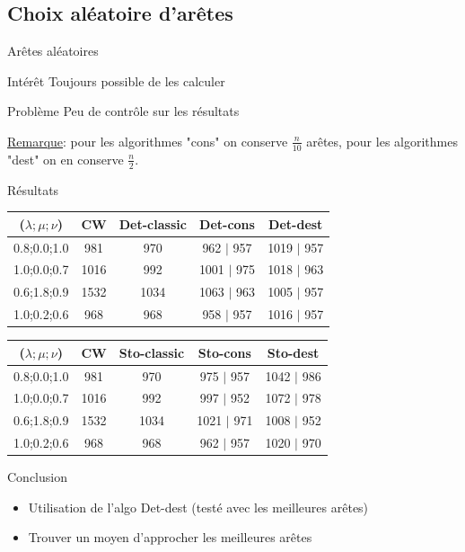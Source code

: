 \documentclass{beamer}
\begin{document}
\subsection{Choix aléatoire d'arêtes}

\begin{frame}{Arêtes aléatoires}

\begin{block}{Intérêt}
Toujours possible de les calculer
\end{block}

\begin{alertblock}{Problème}
Peu de contrôle sur les résultats
\end{alertblock}


\underline{Remarque}: pour les algorithmes "cons" on conserve $\frac{n}{10}$ arêtes, pour les algorithmes "dest" on en conserve $\frac{n}{2}$.

\end{frame}

\begin{frame}{Résultats}

\begin{tabular}{|c|c|c|c|c|}
   \hline
   ($\lambda;\mu;\nu$) & CW & Det-classic & Det-cons & Det-dest \\
   \hline
   0.8;0.0;1.0 &981 & 970 & 962 $|$ 957 & 1019 $|$ 957 \\
   \hline
   1.0;0.0;0.7 &1016& 992 & 1001 $|$ 975 & 1018 $|$ 963 \\
   \hline
   0.6;1.8;0.9 &1532& 1034& 1063 $|$ 963 & 1005 $|$ 957\\
   \hline
   1.0;0.2;0.6 &968& 968 & 958 $|$ 957 & 1016 $|$ 957 \\
   \hline
\end{tabular}

\begin{tabular}{|c|c|c|c|c|}
   \hline
   ($\lambda;\mu;\nu$) & CW & Sto-classic & Sto-cons & Sto-dest \\
   \hline
   0.8;0.0;1.0 &981 & 970 & 975 $|$ 957 & 1042 $|$ 986 \\
   \hline
   1.0;0.0;0.7 &1016& 992 & 997 $|$ 952 & 1072 $|$ 978 \\
   \hline
   0.6;1.8;0.9 &1532& 1034& 1021 $|$ 971 & 1008 $|$ 952\\
   \hline
   1.0;0.2;0.6 &968& 968 & 962 $|$ 957 & 1020 $|$ 970 \\
   \hline
\end{tabular}
\end{frame}

\begin{frame}{Conclusion}
\begin{itemize}
\item Utilisation de l'algo Det-dest (testé avec les meilleures arêtes)
\item Trouver un moyen d'approcher les meilleures arêtes
\end{itemize}
\end{frame}
\end{document}
